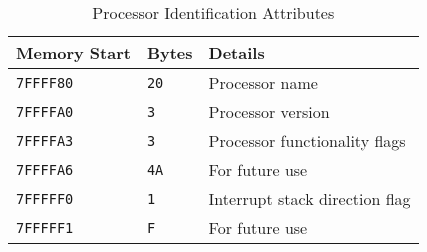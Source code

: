 \begin{table}[H]
\centering
\caption{Processor Identification Attributes}
\begin{tabu} spread 0pt{ X[-1c]  X[-2c]  X[l] }
Memory Start & Bytes & Details \\
\hline
\texttt{7FFFF80} & \texttt{20} & Processor name \\
\texttt{7FFFFA0} & \texttt{3} & Processor version \\
\texttt{7FFFFA3} & \texttt{3} & Processor functionality flags \\
\texttt{7FFFFA6} & \texttt{4A} & For future use \\
\texttt{7FFFFF0} & \texttt{1} & Interrupt stack direction flag \\
\texttt{7FFFFF1} & \texttt{F} & For future use \\
\end{tabu}
\end{table}